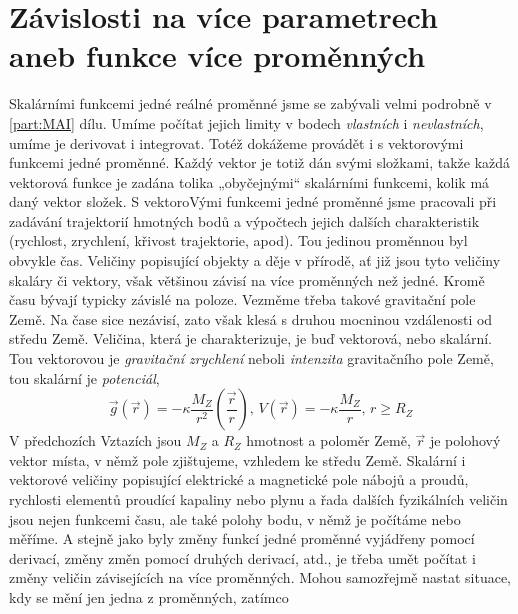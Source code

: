 \setchaptertoc
\chapter{Závislosti na více parametrech aneb funkce více proměnných}\label{mai:IIchapVI}
  Skalárními funkcemi jedné reálné proměnné jsme se zabývali velmi podrobně v \ref{part:MAI} dílu.
  Umíme počítat jejich limity v bodech \emph{vlastních} i \emph{nevlastních}, umíme je derivovat i
  integrovat. Totéž dokážeme provádět i s vektorovými funkcemi jedné proměnné. Každý vektor je totiž
  dán svými složkami, takže každá vektorová funkce je zadána tolika „obyčejnými“ skalárními
  funkcemi, kolik má daný vektor složek. S vektoroVými funkcemi jedné proměnné jsme pracovali při
  zadávání trajektorií hmotných bodů a výpočtech jejich dalších charakteristik (rychlost, zrychlení,
  křivost trajektorie, apod). Tou jedinou proměnnou byl obvykle čas. Veličiny popisující objekty a
  děje v přírodě, ať již jsou tyto veličiny skaláry či vektory, však většinou závisí na více
  proměnných než jedné. Kromě času bývají typicky závislé na poloze. Vezměme třeba takové gravitační
  pole Země. Na čase sice nezávisí, zato však klesá s druhou mocninou vzdálenosti od středu Země.
  Veličina, která je charakterizuje, je buď vektorová, nebo skalární. Tou vektorovou je
  \emph{gravitační zrychlení} neboli \emph{intenzita} gravitačního pole Země, tou skalární je
  \emph{potenciál},
  \begin{equation*}
    \vec{g}(\vec{r}) = - \kappa\dfrac{M_Z}{r^2}\left(\dfrac{\vec{r}}{r}\right),\,
    V(\vec{r}) = -\kappa\dfrac{M_Z}{r}, \, r\geq R_Z
  \end{equation*}
  V předchozích Vztazích jsou \(M_Z\) a \(R_Z\) hmotnost a poloměr Země, \(\vec{r}\) je polohový
  vektor místa, v němž pole zjištujeme, vzhledem ke středu Země. Skalární i vektorové veličiny
  popisující elektrické a magnetické pole nábojů a proudů, rychlosti elementů proudící kapaliny nebo
  plynu a řada dalších fyzikálních veličin jsou nejen funkcemi času, ale také polohy bodu, v němž je
  počítáme nebo měříme. A stejně jako byly změny funkcí jedné proměnné vyjádřeny pomocí derivací,
  změny změn pomocí druhých derivací, atd., je třeba umět počítat i změny veličin závisejících na
  více proměnných. Mohou samozřejmě nastat situace, kdy se mění jen jedna z proměnných, zatímco
